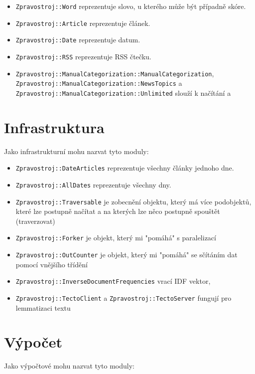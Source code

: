\documentclass[12pt,a4paper]{report}
\begin{document}
\begin{itemize}
	\item \texttt{Zpravostroj::Word} reprezentuje slovo, u kterého může být případně skóre.

	\item \texttt{Zpravostroj::Article} reprezentuje článek.

	\item \texttt{Zpravostroj::Date} reprezentuje datum.

	\item \texttt{Zpravostroj::RSS} reprezentuje RSS čtečku.
	
	\item \texttt{Zpravostroj::ManualCategorization::ManualCategorization}, \texttt{Zpravostroj::ManualCategorization::NewsTopics} a \texttt{Zpravostroj::ManualCategorization::Unlimited} slouží k načítání a 
	
\end{itemize}	

\section{Infrastruktura}
Jako infrastrukturní mohu nazvat tyto moduly:

\begin{itemize}
	\item \texttt{Zpravostroj::DateArticles} reprezentuje všechny články jednoho dne.
	\item \texttt{Zpravostroj::AllDates} reprezentuje všechny dny. 
	\item \texttt{Zpravostroj::Traversable} je zobecnění objektu, který má více podobjektů, které lze postupně načítat a na kterých lze něco postupně spouštět (traverzovat)
	\item \texttt{Zpravostroj::Forker} je objekt, který mi "pomáhá" s paralelizací
	\item \texttt{Zpravostroj::OutCounter} je objekt, který mi "pomáhá" se sčítáním dat pomocí vnějšího třídění
	\item \texttt{Zpravostroj::InverseDocumentFrequencies} vrací IDF vektor,
	\item \texttt{Zpravostroj::TectoClient} a \texttt{Zpravostroj::TectoServer} fungují pro lemmatizaci textu
\end{itemize}	
	
\section{Výpočet}
Jako výpočtové mohu nazvat tyto moduly:
\end{document}
